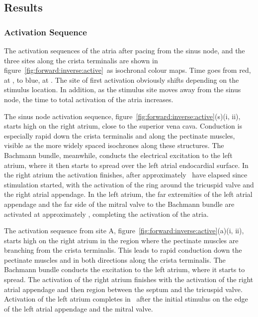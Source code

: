 \subsection{Results}

\subsubsection{Activation Sequence}

The activation sequences of the atria after pacing from the sinus node, and the
three sites along the crista terminalis are shown in
figure~\ref{fig:forward:inverse:active}\ as isochronal colour maps.
Time goes from red, at , to blue, at .
The site of first activation obviously shifts depending on the stimulus
location.
In addition, as the stimulus site moves away from the sinus node, the time to
total activation of the atria increases.

The sinus node activation sequence,
figure~\ref{fig:forward:inverse:active}(s)(i, ii), starts high on the right
atrium, close to the superior vena cava.
Conduction is especially rapid down the crista terminalis and along the
pectinate muscles, visible as the more widely spaced isochrones along these
structures.
The Bachmann bundle, meanwhile, conducts the electrical excitation to the left
atrium, where it then starts to spread over the left atrial endocardial surface.
In the right atrium the activation finishes, after approximately \ have
elapsed since stimulation started, with the activation of the ring around the
tricuspid valve and the right atrial appendage.
In the left atrium, the far extremities of the left atrial appendage and the far
side of the mitral valve to the Bachmann bundle are activated at approximately
, completing the activation of the atria.

The activation sequence from site A,
figure~\ref{fig:forward:inverse:active}(a)(i, ii), starts high on the right
atrium in the region where the pectinate muscles are branching from the crista
terminalis.
This leads to rapid conduction down the pectinate muscles and in both directions
along the crista terminalis.
The Bachmann bundle conducts the excitation to the left atrium, where it starts
to spread.
The activation of the right atrium finishes with the activation of the right
atrial appendage and then region between the septum and the tricuspid valve.
Activation of the left atrium completes in \ after the initial stimulus
on the edge of the left atrial appendage and the mitral valve.

